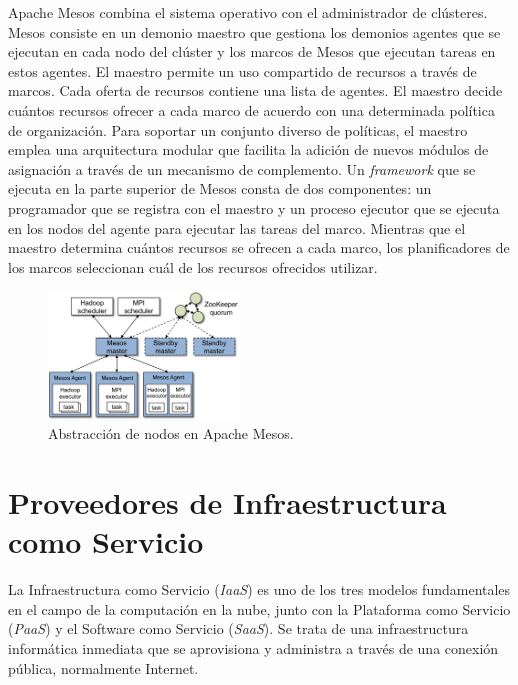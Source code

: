 Apache Mesos combina el sistema operativo con el administrador de clústeres. Mesos consiste en un demonio maestro que gestiona los demonios agentes que se ejecutan en cada nodo del clúster y los marcos de Mesos que ejecutan tareas en estos agentes. El maestro permite un uso compartido de recursos a través de marcos. Cada oferta de recursos contiene una lista de agentes. El maestro decide cuántos recursos ofrecer a cada marco de acuerdo con una determinada política de organización. Para soportar un conjunto diverso de políticas, el maestro emplea una arquitectura modular que facilita la adición de nuevos módulos de asignación a través de un mecanismo de complemento. Un \textit{framework} que se ejecuta en la parte superior de Mesos consta de dos componentes: un programador que se registra con el maestro y un proceso ejecutor que se ejecuta en los nodos del agente para ejecutar las tareas del marco. Mientras que el maestro determina cuántos recursos se ofrecen a cada marco, los planificadores de los marcos seleccionan cuál de los recursos ofrecidos utilizar.

\begin{figure}[H]
\centering
\includegraphics[width=0.45\textwidth]{images/figures/apachemesos.png}
\caption{Abstracción de nodos en Apache Mesos.\footnotemark}
\end{figure}


\section{Proveedores de Infraestructura como Servicio}

La Infraestructura como Servicio (\textit{IaaS}) es uno de los tres modelos fundamentales en el campo de la computación en la nube, junto con la Plataforma como Servicio (\textit{PaaS}) y el Software como Servicio (\textit{SaaS}). Se trata de una infraestructura informática inmediata que se aprovisiona y administra a través de una conexión pública, normalmente Internet.

